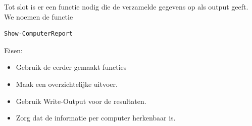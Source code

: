 Tot slot is er een functie nodig die de verzamelde gegevens op als output geeft. We noemen de functie
\begin{lstlisting}[language=bash]
Show-ComputerReport
\end{lstlisting}

Eisen:
\begin{itemize}
\item Gebruik de eerder gemaakt functies
\item Maak een overzichtelijke uitvoer.
\item Gebruik Write-Output voor de resultaten.
\item Zorg dat de informatie per computer herkenbaar is.
\end{itemize}

